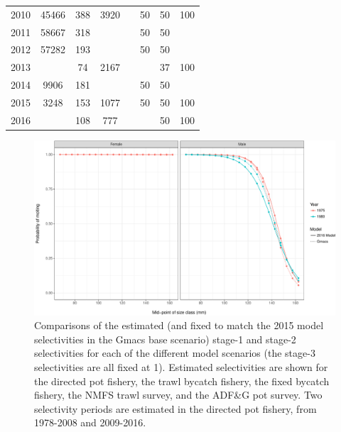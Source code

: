 \documentclass[]{article}
\begin{document}
\begin{table}[ht]
\begin{tabular}{lccccccc}
  2010 &  45466       & 388        &  3920    & & 50           & 50         & 100 \\
  2011 &  58667       & 318        &          & & 50           & 50         & \\
  2012 &  57282       & 193        &          & & 50           & 50         & \\
  2013 &              &  74        &  2167    & &              & 37         & 100 \\
  2014 &  9906        & 181        &          & & 50           & 50         & \\
  2015 &  3248        & 153        &  1077    & & 50           & 50         & 100 \\
  2016 &              & 108        &   777    & &              & 50         & 100 \\
  \hline
\end{tabular}
\end{table}

\newpage

\clearpage

\begin{figure}[htbp]
\centering
\includegraphics{bbrkc_files/figure-latex/molt_prob-1.pdf}
\caption{Comparisons of the estimated (and fixed to match the 2015 model
selectivities in the Gmacs base scenario) stage-1 and stage-2
selectivities for each of the different model scenarios (the stage-3
selectivities are all fixed at 1). Estimated selectivities are shown for
the directed pot fishery, the trawl bycatch fishery, the fixed bycatch
fishery, the NMFS trawl survey, and the ADF\&G pot survey. Two
selectivity periods are estimated in the directed pot fishery, from
1978-2008 and 2009-2016.\label{fig:molt_prob}}
\end{figure}
\end{document}
